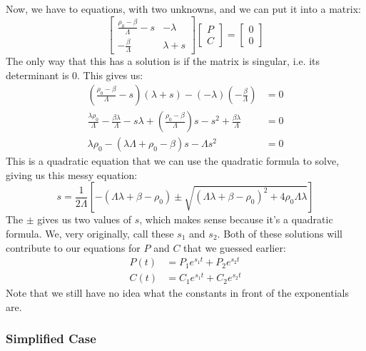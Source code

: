 \documentclass[letter]{article}
\begin{document}
Now, we have to equations, with two unknowns, and we can put it into a matrix:
\begin{equation*}
\begin{bmatrix}
  \frac{\rho_0-\beta}{\Lambda}-s & -\lambda \\
  -\frac{\beta}{\Lambda} & \lambda + s
\end{bmatrix}
\begin{bmatrix}
  P \\ C
\end{bmatrix}
=
\begin{bmatrix}
  0 \\ 0
\end{bmatrix}
\end{equation*}
The only way that this has a solution is if the matrix is singular,
i.e. its determinant is 0. This gives us:
\begin{equation*}
  \begin{split}
    \left(\frac{\rho_0-\beta}{\Lambda}-s\right)(\lambda +
    s)-(-\lambda)\left(-\frac{\beta}{\Lambda}\right) &= 0 \\
    \frac{\lambda\rho_0}{\Lambda} -
    \frac{\beta\lambda}{\Lambda}-s\lambda +
    \left(\frac{\rho_0-\beta}{\Lambda}\right)s-s^2+\frac{\beta\lambda}{\Lambda}
    &= 0 \\
    \lambda\rho_0-(\lambda\Lambda+\rho_0-\beta)s-\Lambda{}s^2 &= 0
  \end{split}
\end{equation*}
This is a quadratic equation that we can use the quadratic formula to
solve, giving us this messy equation:
\begin{equation*}
  s=\frac{1}{2\Lambda}\left[-(\Lambda\lambda+\beta-\rho_0) \pm \sqrt{(\Lambda\lambda+\beta-\rho_0)^2+4\rho_0\Lambda\lambda}\right]
\end{equation*}
The $\pm$ gives us two values of $s$, which makes sense because it's a
quadratic formula. We, very originally, call these $s_1$ and
$s_2$. Both of these solutions will contribute to our equations for
$P$ and $C$ that we guessed earlier:
\begin{equation*}
  \begin{split}
    P(t)&=P_1e^{s_1t}+P_2e^{s_2t} \\
    C(t)&=C_1e^{s_1t}+C_2e^{s_2t}
  \end{split}
\end{equation*}
Note that we still have no idea what the constants in front of the
exponentials are.

\subsubsection{Simplified Case}
\end{document}
